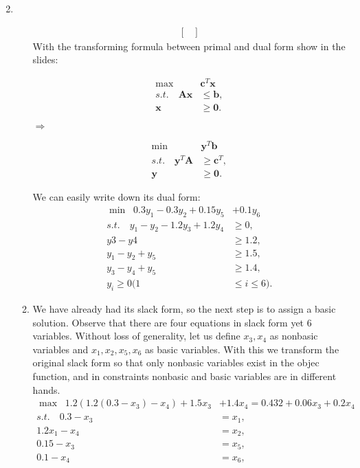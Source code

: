 \documentclass[12pt,a4paper]{article}
\makeatletter
\newtheorem*{solution}{Solution}
\theoremstyle{definition}
\renewenvironment{solution}[1][Solution] {\par\pushQED{\qed}\normalfont\topsep6\p@\@plus6\p@\relax\trivlist\item[\hskip\labelsep\bfseries#1\@addpunct{.}]\ignorespaces}{\popQED\endtrivlist\@endpefalse} \makeatother
\makeatother
\begin{document}
\begin{enumerate}
\begin{solution}
\begin{enumerate}
\begin{align*}
\begin{bmatrix}
		\end{bmatrix}	
		\end{align*}
		 With the transforming formula between primal and dual form show in the slides:\newline
		 \begin{minipage}{0.45\textwidth}
		 	\begin{align*}
		 	\max\;\; &\mathbf{c}^T\mathbf{x}\\
		 	s.t.\quad \mathbf{Ax}&\leq\mathbf{b},\\
		 	\mathbf{x}&\geq\mathbf{0}.
		 	\end{align*} 
		 \end{minipage}
		 $\Rightarrow$
		 \begin{minipage}{0.45\textwidth}
		 	\begin{align*}
		 	\min\;\; &\mathbf{y}^T\mathbf{b}\\
		 	s.t.\quad \mathbf{y}^T\mathbf{A}&\geq\mathbf{c}^T,\\
		 	\mathbf{y}&\geq\mathbf{0}.
		 	\end{align*} 
		 \end{minipage}
		 We can easily write down its dual form:
		 \begin{align*}
		 	\min\;\; 0.3y_1-0.3y_2+0.15y_5&+0.1y_6\\
		 s.t.\quad	y_1-y_2-1.2y_3+1.2y_4&\geq0,\\
		 	y3-y4&\geq1.2,\\
		 	y_1-y_2+y_5&\geq1.5,\\
		 	y_3-y_4+y_5&\geq1.4,\\
		 	y_i\geq 0(1&\leq i\leq6).
		 \end{align*}
	\item 	 We have already had its slack form, so the next step is to assign a basic solution. Observe that there are four equations in slack form yet 6 variables. Without loss of generality, let us define $x_3,x_4$ as nonbasic variables and $x_1,x_2,x_5,x_6$ as basic variables. With this we transform the original slack form so that only nonbasic variables exist in the objec function, and in constraints nonbasic and basic variables are in different hands.
	\begin{align*}
		\max\;\; 1.2(1.2(0.3-x_3)-x_4)+1.5x_3&+1.4x_4=0.432+0.06x_3+0.2x_4\\
		s.t. \quad 0.3-x_3&=x_1,\\
		1.2x_1-x_4&=x_2,\\
		0.15-x_3&=x_5,\\
		0.1-x_4&=x_6,\\

\end{align*}
\end{enumerate}
\end{solution}
\end{enumerate}
\end{document}
